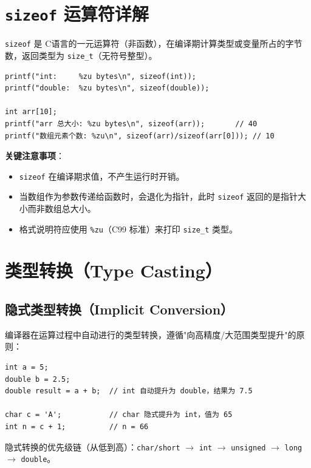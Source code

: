 \section{\texttt{sizeof} 运算符详解}

\texttt{sizeof} 是 C语言的一元运算符（非函数），在编译期计算类型或变量所占的字节数，返回类型为 \texttt{size\_t}（无符号整型）。

\begin{lstlisting}[caption={sizeof 使用示例}]
printf("int:     %zu bytes\n", sizeof(int));
printf("double:  %zu bytes\n", sizeof(double));

int arr[10];
printf("arr 总大小: %zu bytes\n", sizeof(arr));       // 40
printf("数组元素个数: %zu\n", sizeof(arr)/sizeof(arr[0])); // 10
\end{lstlisting}

\textbf{关键注意事项}：

\begin{itemize}
    \item \texttt{sizeof} 在编译期求值，不产生运行时开销。
    \item 当数组作为参数传递给函数时，会退化为指针，此时 \texttt{sizeof} 返回的是指针大小而非数组总大小。
    \item 格式说明符应使用 \texttt{\%zu}（C99 标准）来打印 \texttt{size\_t} 类型。
\end{itemize}

\section{类型转换（Type Casting）}

\subsection{隐式类型转换（Implicit Conversion）}

编译器在运算过程中自动进行的类型转换，遵循"向高精度/大范围类型提升"的原则：

\begin{lstlisting}[caption={隐式类型转换}]
int a = 5;
double b = 2.5;
double result = a + b;  // int 自动提升为 double，结果为 7.5

char c = 'A';           // char 隐式提升为 int，值为 65
int n = c + 1;          // n = 66
\end{lstlisting}

隐式转换的优先级链（从低到高）：\texttt{char/short} $\to$ \texttt{int} $\to$ \texttt{unsigned} $\to$ \texttt{long} $\to$ \texttt{double}。


